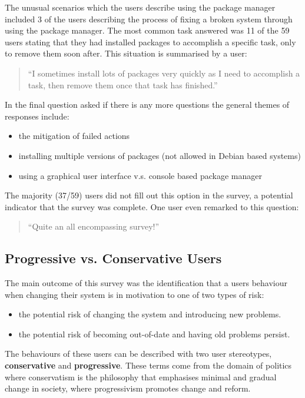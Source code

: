 The unusual scenarios which the users describe using the package manager included
3 of the users describing the process of fixing a broken system through using the package manager. 
The most common task answered was 11 of the 59 users stating that they had installed packages to accomplish a specific task, only to remove them soon after.
This situation is summarised by a user: 
\begin{quote}
``I sometimes install lots of packages very quickly as I need to accomplish a task, then remove them once that task has finished.''
\end{quote}

In the final question asked if there is any more questions the general themes of responses include:
\begin{itemize}
  \item the mitigation of failed actions
  \item installing multiple versions of packages (not allowed in Debian based systems)
  \item using a graphical user interface v.s. console based package manager
\end{itemize} 
The majority (37/59) users did not fill out this option in the survey, a potential indicator that the survey was complete.
One user even remarked to this question:
\begin{quote}
``Quite an all encompassing survey!''
\end{quote}

\subsection{Progressive vs. Conservative Users}
The main outcome of this survey was the identification that a users behaviour when changing their system is in motivation to one of two types of risk:
\begin{itemize}
  \item the potential risk of changing the system and introducing new problems.
  \item the potential risk of becoming out-of-date and having old problems persist.
\end{itemize}
The behaviours of these users can be described with two user stereotypes, \textbf{conservative} and \textbf{progressive}.
These terms come from the domain of politics where conservatism is the philosophy that emphasises minimal and gradual change in society,
where progressivism promotes change and reform.

